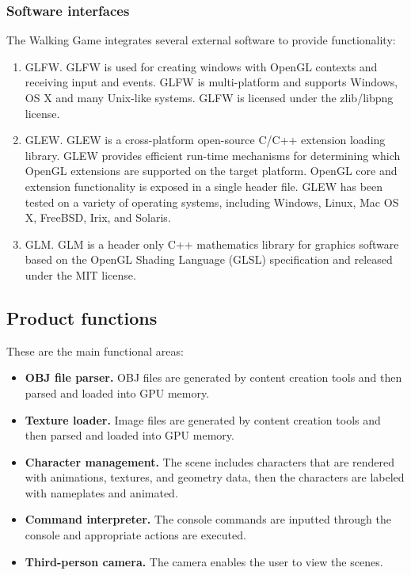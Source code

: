 \documentclass[12pt]{article}
\begin{document}
	\subsubsection{Software interfaces}
	The Walking Game integrates several external software to provide functionality:
	\begin{enumerate}
		\item GLFW. GLFW is used for creating windows with OpenGL contexts and receiving input and events. GLFW is multi-platform and supports Windows, OS X and many Unix-like systems. GLFW is licensed under the zlib/libpng license.
		\item GLEW. GLEW is a cross-platform open-source C/C++ extension loading library. GLEW provides efficient run-time mechanisms for determining which OpenGL extensions are supported on the target platform. OpenGL core and extension functionality is exposed in a single header file. GLEW has been tested on a variety of operating systems, including Windows, Linux, Mac OS X, FreeBSD, Irix, and Solaris.
		\item GLM. GLM is a header only C++ mathematics library for graphics software based on the OpenGL Shading Language (GLSL) specification and released under the MIT license.
	\end{enumerate}
	
	\subsection{Product functions}
	These are the main functional areas:
	
	\begin{itemize}
		\item \textbf{OBJ file parser.} OBJ files are generated by content creation tools and then parsed and loaded into GPU memory.
		
		\item \textbf{Texture loader.} Image files are generated by content creation tools and then parsed and loaded into GPU memory.
		
		\item \textbf{Character management.} The scene includes characters that are rendered with animations, textures, and geometry data, then the characters are labeled with nameplates and animated.
		
		\item \textbf{Command interpreter.} The console commands are inputted through the console and appropriate actions are executed.
		
		\item \textbf{Third-person camera.} The camera enables the user to view the scenes.
	\end{itemize}
	
\end{document}

